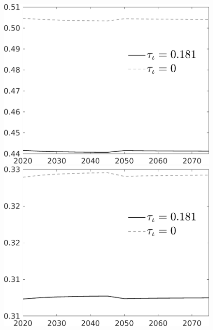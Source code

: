 \documentclass[12pt]{article}
\begin{document}
\begin{figure}[h!!]
\begin{minipage}[]{0.32\textwidth}
	\end{minipage}	
	\begin{minipage}[]{0.32\textwidth}
		\includegraphics[width=1\textwidth]{../../codding_model/own_basedOnFried/optimalPol_010922_revision/figures/all_13Sept22/CompTauf_bytaul_Equlab_Reg0_hh_spillover0_nsk0_xgr0_knspil0_sep1_LFlimit1_emsbase0_countec0_GovRev0_etaa0.79_lgd1.png}
	\end{minipage}	
	\begin{minipage}[]{0.32\textwidth}
		\includegraphics[width=1\textwidth]{../../codding_model/own_basedOnFried/optimalPol_010922_revision/figures/all_13Sept22/CompTauf_bytaul_Equlab_Reg0_hl_spillover0_nsk0_xgr0_knspil0_sep1_LFlimit1_emsbase0_countec0_GovRev0_etaa0.79_lgd1.png}

\end{minipage}
\end{figure}
\end{document}
